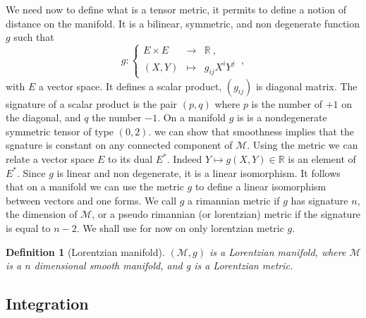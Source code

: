 \documentclass[10pt]{book}
\newcommand{\Mcal}{\mathcal{M}}
\newcommand{\Rbb}{\mathbb{R}}
\theoremstyle{break}
\newtheorem{definition}{Definition}
\begin{document}
%


\bigskip


We need now to define what is a tensor metric, it permits to define a notion of distance on the manifold. It is a bilinear, symmetric, and non degenerate function $g$ such that
%
\begin{equation*}
g : \left\{ 
\begin{array}{lcl}
E \times E & \to & \Rbb \ , \\
(X,Y) & \mapsto & g_{ij} X^i Y^j
\end{array}
\right. \ ,
\end{equation*}
%
with $E$ a vector space. It defines a scalar product, $(g_{ij})$ is diagonal matrix. The signature of a scalar product is the pair $(p,q)$ where $p$ is the number of $+1$ on the diagonal, and $q$ the number $-1$. On a manifold $g$ is is a nondegenerate symmetric tensor of type $(0,2)$. we can show that smoothness implies that the sgnature is constant on any connected component of $\Mcal$. Using the metric we can relate a vector space $E$ to its dual $E^\ast$. Indeed $Y \mapsto g(X,Y) \in \Rbb$ is an element of $E^\ast$. Since $g$ is linear and non degenerate, it is a linear isomorphism. It follows that on a manifold we can use the metric $g$ to define a linear isomorphism between vectors and one forms. We call $g$ a rimannian metric if $g$ has signature $n$, the dimension of $\Mcal$, or a pseudo rimannian (or lorentzian) metric if the signature is equal to $n-2$. We shall use for now on only lorentzian metric $g$.


\begin{definition}[Lorentzian manifold]
$(\Mcal,g)$ is a Lorentzian manifold, where $\Mcal$ is a $n$ dimensional smooth manifold, and g is a Lorentzian metric.
\end{definition}


\subsection{Integration}
\end{document}
